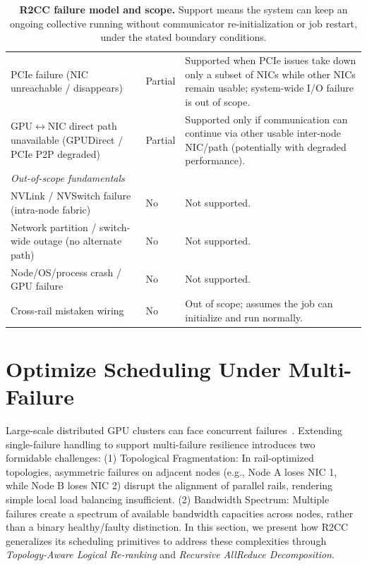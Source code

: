 \documentclass[letterpaper,twocolumn,10pt]{article}
\begin{document}
\begin{table}[!t]
\begin{tabular}{p{}p{}p{}}
PCIe failure (NIC unreachable / disappears) & Partial &
Supported when PCIe issues take down only a subset of NICs while other NICs remain usable; system-wide I/O failure is out of scope. \\
\addlinespace

GPU$\leftrightarrow$NIC direct path unavailable (GPUDirect / PCIe P2P degraded) & Partial &
Supported only if communication can continue via other usable inter-node NIC/path (potentially with degraded performance). \\

\midrule
\multicolumn{3}{l}{\textit{Out-of-scope fundamentals}} \\
\midrule

NVLink / NVSwitch failure (intra-node fabric) & No &
Not supported. \\
\addlinespace

Network partition / switch-wide outage (no alternate path) & No &
Not supported. \\
\addlinespace

Node/OS/process crash / GPU failure & No &
Not supported. \\
\addlinespace

Cross-rail mistaken wiring & No &
Out of scope; assumes the job can initialize and run normally. \\
\bottomrule
\end{tabular}
\caption{\textbf{R2CC failure model and scope.} Support means the system can keep an ongoing collective running without communicator re-initialization or job restart, under the stated boundary conditions.}
\label{tab:r2cc-failure-scope}
\end{table}

\section{Optimize Scheduling Under Multi-Failure}
\label{sec:multi-failure}
Large-scale distributed GPU clusters can face concurrent failures~\cite{Revisiting_Reliability}.
Extending single-failure handling to support multi-failure resilience introduces two formidable challenges:
(1) Topological Fragmentation: In rail-optimized topologies, asymmetric failures on adjacent nodes (e.g., Node A loses NIC 1, while Node B loses NIC 2) disrupt the alignment of parallel rails, rendering simple local load balancing insufficient.
(2) Bandwidth Spectrum: Multiple failures create a spectrum of available bandwidth capacities across nodes, rather than a binary healthy/faulty distinction.
In this section, we present how R2CC generalizes its scheduling primitives to address these complexities through \textit{Topology-Aware Logical Re-ranking} and \textit{Recursive AllReduce Decomposition}.
\end{document}
